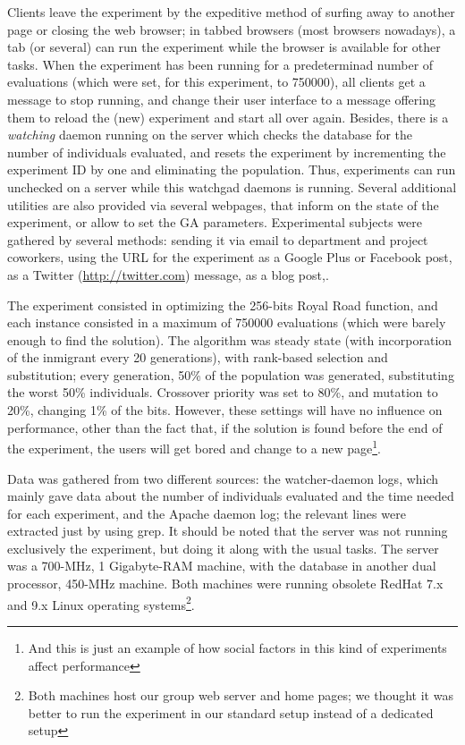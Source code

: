 \documentclass{llncs}
\begin{document}
Clients leave the experiment by the expeditive method of surfing away
to another page or closing the web browser; in tabbed browsers (most
browsers nowadays), a tab (or several) can run the experiment while
the browser is available for other tasks. When the experiment has been
running for a predeterminad number of evaluations (which were set, for
this experiment, to 750000), all clients get a message to stop
running, and change their user interface to a message offering them to
reload the (new) experiment and start all over again. 
Besides, there is a {\em watching} daemon running on the server which
checks the database for the number of individuals evaluated, and
resets the experiment by incrementing the experiment ID by one and
eliminating the population. Thus, experiments can run unchecked on a
server while this {\sf watchgad} daemons is running. 
Several additional utilities are also provided via several webpages,
that inform on the state of the experiment, or allow to set the GA
parameters. 
Experimental subjects were gathered by several methods: sending it via
email to department and project coworkers, using the URL
for the experiment as a Google Plus or Facebook post, as a Twitter
(\url{http://twitter.com}) message, as a blog post,.

The experiment consisted in optimizing the  256-bits Royal Road
function, and each instance consisted in a maximum of 750000
evaluations (which were barely enough to find the solution). The
algorithm was steady state (with incorporation of the inmigrant every 20
generations), with rank-based selection and substitution; every
generation, 50\% of the population was generated, substituting the
worst 50\% individuals. Crossover priority was set to 80\%, and
mutation  to 20\%, changing 1\% of the bits. However, these settings
will have no influence on performance, other than the fact that, if
the solution is found before the end of the experiment, the users will
get bored and change to a new page\footnote{And this is just an example of how
social factors in this kind of experiments affect performance}.

Data was gathered from two different sources: the watcher-daemon logs,
which mainly gave data about the number of individuals evaluated and
the time needed for each experiment, and the Apache daemon log; the
relevant lines were extracted just by using {\sf grep}. It should be
noted that the server was not running exclusively the experiment, but
doing it along with the usual tasks. The server was a 700-MHz, 1
Gigabyte-RAM machine, with the database in another dual processor,
450-MHz machine. Both machines were running obsolete RedHat 7.x and
9.x Linux operating systems\footnote{Both machines host our group web
  server and home pages; we thought it was better to run the
  experiment in our standard setup instead of a dedicated
  setup}. 
\end{document}
